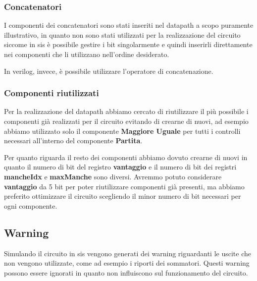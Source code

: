 \documentclass[a4paper]{article}
\begin{document}
\subsubsection{Concatenatori}
I componenti dei concatenatori sono stati inseriti nel datapath a scopo puramente illustrativo, in quanto
non sono stati utilizzati per la realizzazione del circuito siccome in sis è possibile gestire i bit singolarmente
e quindi inserirli direttamente nei componenti che li utilizzano nell'ordine desiderato.

\noindent In verilog, invece,
è possibile utilizzare l'operatore di concatenazione.

\subsubsection{Componenti riutilizzati}
Per la realizzazione del datapath abbiamo cercato di riutilizzare il più possibile i componenti già realizzati per il circuito
evitando di crearne di nuovi, ad esempio abbiamo utilizzato solo il componente \textbf{Maggiore Uguale} per 
tutti i controlli necessari all'interno del componente \textbf{Partita}.

\noindent Per quanto riguarda il resto dei componenti abbiamo dovuto crearne di nuovi in quanto il numero di
bit del registro \textbf{vantaggio} e il numero di bit dei registri \textbf{mancheIdx} e \textbf{maxManche}
sono diversi. Avremmo potuto considerare \textbf{vantaggio} da 5 bit per poter riutilizzare componenti già presenti,
ma abbiamo preferito ottimizzare il circuito scegliendo il minor numero di bit necessari per ogni componente.

\subsection{Warning}
Simulando il circuito in sis vengono generati dei warning riguardanti le uscite che non vengono utilizzate, come
ad esempio i riporti dei sommatori. Questi warning possono essere ignorati in quanto non influiscono sul funzionamento
del circuito.
\end{document}
